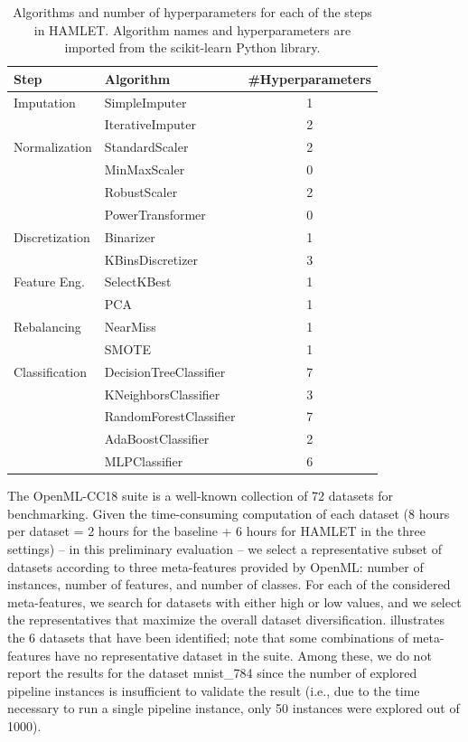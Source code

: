 \documentclass[5p,times]{elsarticle}
\begin{document}
\begin{table}[t]
    \footnotesize
    \caption{Algorithms and number of hyperparameters for each of the steps in HAMLET. Algorithm names and hyperparameters are imported from the scikit-learn Python library.}
    \centering
    \begin{tabular}{llc}
        \toprule
        \textbf{Step} & \textbf{Algorithm} & \textbf{\#Hyperparameters}  \\\midrule
        Imputation        & SimpleImputer & 1 \\
                          & IterativeImputer & 2 \\
        Normalization     & StandardScaler & 2 \\
                          & MinMaxScaler & 0 \\
                          & RobustScaler & 2 \\
                          & PowerTransformer & 0 \\
        Discretization    & Binarizer & 1 \\
                          & KBinsDiscretizer & 3 \\
        Feature Eng.      & SelectKBest & 1 \\
                          & PCA & 1 \\
        Rebalancing       & NearMiss & 1 \\
                          & SMOTE & 1 \\
        Classification    & DecisionTreeClassifier & 7 \\
                          & KNeighborsClassifier & 3 \\
                          & RandomForestClassifier & 7 \\ 
                          & AdaBoostClassifier & 2 \\ 
                          & MLPClassifier & 6 \\ \bottomrule
    \end{tabular}
    \label{tab:search_space}
\end{table}

The OpenML-CC18 suite is a well-known collection of 72 datasets for benchmarking.
Given the time-consuming computation of each dataset (8 hours per dataset = 2 hours for the baseline + 6 hours for HAMLET in the three settings) -- in this preliminary evaluation -- we select a representative subset of datasets according to three meta-features provided by OpenML: number of instances, number of features, and number of classes.
For each of the considered meta-features, we search for datasets with either high or low values, and we select the representatives that maximize the overall dataset diversification.
 illustrates the 6 datasets that have been identified; note that some combinations of meta-features have no representative dataset in the suite.
Among these, we do not report the results for the dataset mnist\_784 since the number of explored pipeline instances is insufficient to validate the result (i.e., due to the time necessary to run a single pipeline instance, only 50 instances were explored out of 1000).
\end{document}
